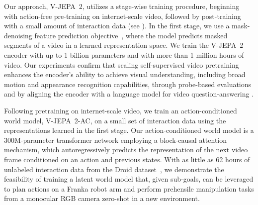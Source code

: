 \documentclass[]{kling/kling}
\newcommand{\model}{V-JEPA~2\xspace}
\newcommand{\acModel}{V-JEPA~2-AC\xspace}
\begin{document}
Our approach, \model, utilizes a stage-wise training procedure, beginning with action-free pre-training on internet-scale video, followed by post-training with a small amount of interaction data (see ).
In the first stage, we use a mask-denoising feature prediction objective~\citep{assran2023self,bardes2024revisiting}, where the model predicts masked segments of a video in a learned representation space.
We train the \model  encoder with up to 1 billion parameters and with more than 1 million hours of video.
Our experiments confirm that scaling self-supervised  video pretraining enhances the encoder's ability to achieve visual understanding, including broad motion and appearance recognition capabilities, through probe-based evaluations and by aligning the encoder with a language model for video question-answering \citep{benno2024, patraucean2023perception, liu2024tempcompass, cai2024temporalbench, shangguan2024tomato}.


Following pretraining on internet-scale video, we train an action-conditioned world model, \acModel, on a small set of interaction data using the representations learned in the first stage.
Our action-conditioned world model is a 300M-parameter transformer network employing a block-causal attention mechanism, which autoregressively predicts the representation of the next video frame conditioned on an action and previous states.
With as little as 62 hours of unlabeled interaction data from the Droid dataset~\citep{khazatsky2024droid}, we demonstrate the feasibility of training a latent world model that, given sub-goals, can be leveraged to plan actions on a Franka robot arm and perform prehensile manipulation tasks from a monocular RGB camera zero-shot in a new environment.
\end{document}
